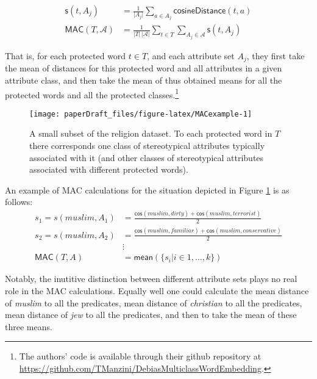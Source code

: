 \documentclass[
  12pt,
  dvipsnames,enabledeprecatedfontcommands]{scrartcl}
\begin{document}
\begin{align*}
\mathsf{s}(t, A_j) & = \frac{1}{\vert A_j\vert}\sum_{a\in A_j}\mathsf{cosineDistance}(t,a) \\
\mathsf{MAC}(T,\mathcal{A}) & = \frac{1}{\vert T \vert \,\vert \mathcal{A}\vert}\sum_{t \in T }\sum_{A_j \in \mathcal{A}}    \mathsf{s}(t,A_j)
\end{align*}

\noindent That is, for each protected word \(t\in T\), and each
attribute set \(A_j\), they first take the mean of distances for this
protected word and all attributes in a given attribute class, and then
take the mean of thus obtained means for all the protected words and all
the protected classes.\footnote{The authors' code is available through
  their github repository at
  \url{https://github.com/TManzini/DebiasMulticlassWordEmbedding}.}

\begin{figure}[H]

\begin{center}\texttt{[image: paperDraft\_files/figure-latex/MACexample-1]} \end{center}
\caption{A small subset of the religion dataset.  To each protected word in $T$  there corresponds one class of stereotypical attributes typically associated with it (and other classes of stereotypical attributes associated with different protected words).}
\label{fig:MACexample}
\end{figure}

\noindent An example of \textsf{MAC} calculations for the situation
depicted in Figure \ref{fig:MACexample} is as follows: \begin{align*}
s_1   = s(muslim,A_1)  & = \frac{\mathsf{cos}(muslim,dirty)+\mathsf{cos}(muslim,terrorist)}{2} \\ 
s_2   = s(muslim,A_2)  & = \frac{\mathsf{cos}(muslim,familiar)+\mathsf{cos}(muslim,conservative)}{2}\\ & \vdots \\ 
\mathsf{MAC}(T,A)  & = \mathsf{mean}(\{s_i \vert i \in 1, \dots, k\})
\end{align*}

Notably, the inutitive distinction between different attribute sets
plays no real role in the \textsf{MAC} calculations. Equally well one
could calculate the mean distance of \emph{muslim} to all the
predicates, mean distance of \emph{christian} to all the predicates,
mean distance of \emph{jew} to all the predicates, and then to take the
mean of these three means.
\end{document}
